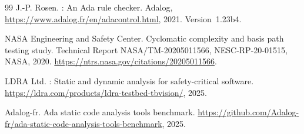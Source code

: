 \documentclass[10pt,twocolumn,letterpaper]{article}
\begin{document}
\begin{thebibliography}{99}
J.-P. Rosen.
: An Ada rule checker.
\newblock Adalog, \url{https://www.adalog.fr/en/adacontrol.html}, 2021.
\newblock Version~1.23b4.

{NASA Engineering and Safety Center}.
\newblock Cyclomatic complexity and basis path testing study.
\newblock Technical Report NASA/TM-20205011566, NESC-RP-20-01515, NASA, 2020.
\newblock \url{https://ntrs.nasa.gov/citations/20205011566}.

{LDRA Ltd.}
: Static and dynamic analysis for safety-critical
  software.
\newblock \url{https://ldra.com/products/ldra-testbed-tbvision/}, 2025.

{Adalog-fr}.
\newblock Ada static code analysis tools benchmark.
\newblock \url{https://github.com/Adalog-fr/ada-static-code-analysis-tools-benchmark},
  2025.

\end{thebibliography}
\end{document}
